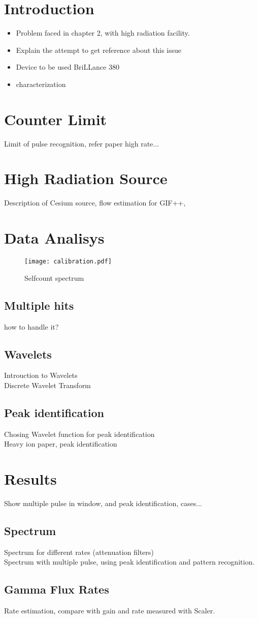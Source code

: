 \section{Introduction}
\begin{itemize}
\item Problem faced in chapter 2, with high radiation facility.
\item Explain the attempt to get reference about this issue
\item Device to be used BriLLance 380
\item characterization
\end{itemize}
\section{Counter Limit}
Limit of pulse recognition, refer paper high rate...
\section{High Radiation Source}
Description of Cesium source, flow estimation for GIF++, 
\section{Data Analisys}
\begin{figure}[ht]
		\centering
		\texttt{[image: calibration.pdf]}
		\caption{Selfcount spectrum}\label{fig:selfcount}
\end{figure}

\subsection{Multiple hits}
how to handle it?\\
\subsection{Wavelets}
Introuction to Wavelets\\
Discrete Wavelet Transform\\
\subsection{Peak identification}
Chosing Wavelet function for peak identification\\
Heavy ion paper, peak identification\\
\section{Results}
Show multiple pulse in window, and peak identification, cases...
\subsection{Spectrum}
Spectrum for different rates (attenuation filters)\\
Spectrum with multiple pulse, using peak identification and pattern recognition.\\
\subsection{Gamma Flux Rates}
Rate estimation, compare with gain and rate measured with Scaler.




